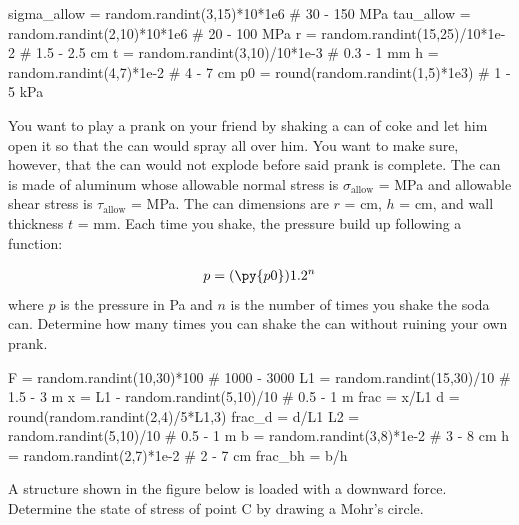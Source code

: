 \documentclass[
10pt,
a4paper,
openany,
svgnames,
]{kaobook} %
\begin{document}
\begin{exercises}
\begin{pycode}
sigma_allow = random.randint(3,15)*10*1e6 # 30 - 150 MPa
tau_allow = random.randint(2,10)*10*1e6 # 20 - 100 MPa
r = random.randint(15,25)/10*1e-2 # 1.5 - 2.5 cm
t = random.randint(3,10)/10*1e-3 # 0.3 - 1 mm
h = random.randint(4,7)*1e-2 # 4 - 7 cm
p0 = round(random.randint(1,5)*1e3) # 1 - 5 kPa
\end{pycode}

  \item You want to play a prank on your friend by shaking a can of coke and let him open it so that the can would spray all over him. You want to make sure, however, that the can would not explode before said prank is complete. The can is made of aluminum whose allowable normal stress is $\sigma_{\text{allow}}$ =  MPa and allowable shear stress is $\tau_{\text{allow}}$ =  MPa. The can dimensions are $r$ =  cm, $h$ =  cm, and wall thickness $t$ =  mm. Each time you shake, the pressure build up following a function:

        \begin{align*}
          p = (\py{p0})1.2^{n}
        \end{align*}
        where $p$ is the pressure in Pa and $n$ is the number of times you shake the soda can. Determine how many times you can shake the can without ruining your own prank.

\begin{pycode}
F = random.randint(10,30)*100 # 1000 - 3000
L1 = random.randint(15,30)/10 # 1.5 - 3 m
x = L1 - random.randint(5,10)/10 # 0.5 - 1 m
frac = x/L1
d = round(random.randint(2,4)/5*L1,3)
frac_d = d/L1
L2 = random.randint(5,10)/10 # 0.5 - 1 m
b = random.randint(3,8)*1e-2 # 3 - 8 cm
h = random.randint(2,7)*1e-2 # 2 - 7 cm
frac_bh = b/h
\end{pycode}

  \item A structure shown in the figure below is loaded with a downward force. Determine the state of stress of point C by drawing a Mohr's circle.


\end{exercises}
\end{document}
